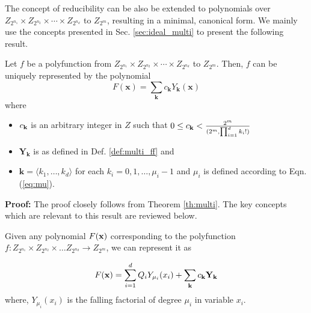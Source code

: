 \label{ch:appendix}

The concept of reducibility can be also be extended to polynomials over
$Z_{2^{n_1}}\times Z_{2^{n_2}} \times \cdots \times Z_{2^{n_d}}$ to
$Z_{2^{m}}$, resulting in a minimal, canonical form. We mainly use the concepts
presented in Sec. \ref{sec:ideal_multi} to present the following result.

\begin{Theorem}\label{th:can_multi}
Let $f$ be a polyfunction from $Z_{2^{n_1}}\times Z_{2^{n_2}} \times
\cdots \times Z_{2^{n_d}}$ to $Z_{2^{m}}$. Then, $f$ can be uniquely
represented by the polynomial
\begin{equation} \label{eq:can_multi}
F(\textbf{x}) = \sum_{\textbf{k}}c_\textbf{k}{Y}_\textbf{k}(\textbf{x})
\end{equation}
where 
\begin{itemize}
\item $c_{\bf k}$ is an arbitrary integer in $Z$ such that $0 \leq c_{\bf k} < {{2^m} \over
  {(2^m,\prod_{i=1}^{d} k_i!)}}$ 
\item $\textbf{Y}_\textbf{k}$ is as defined in Def. \ref{def:multi_ff} and
\item $\textbf{k} = \langle k_1, \ldots, k_d \rangle$ for each $k_i = 0, 1, \ldots,
      \mu_i-1$ and $\mu_i$ is defined according to Eqn.(\ref{eq:mu}).
\end{itemize}
\end{Theorem}

{\bf Proof:} The proof closely follows from Theorem
\ref{th:multi}. The key concepts which are relevant to this
result are reviewed below.

Given any polynomial $F({\bf x})$ corresponding to the polyfunction
$f:Z_{2^{n_1}} \times Z_{2^{n_2}} \times \ldots Z_{2^{n_d}}
\rightarrow Z_{2^m}$, we can represent it as

\begin{equation}\label{eq:proof1_1}
F({\bf x}) = \sum _{i=1}^d Q_i Y_{\mu_i}(x_i) + \sum_{\textbf{k}}c_\textbf{k}\textbf{Y}_\textbf{k} 
\end{equation}
where, $Y_{\mu_i}(x_i)$ is the falling factorial of degree $\mu_i$ in
  variable $x_i$.


